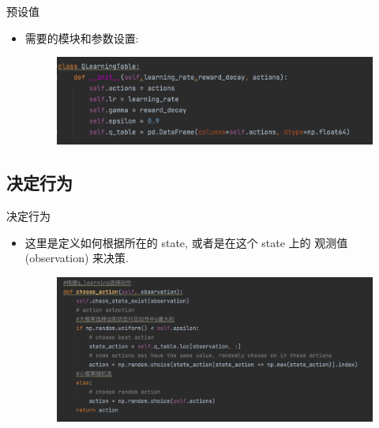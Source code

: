 \documentclass{beamer}
\begin{document}
\begin{frame}{预设值}
    \begin{itemize}
    \item 需要的模块和参数设置:
    \\
    \begin{minipage}{0.5\linewidth}
        \medskip
        \begin{figure}[h]
            \centering
            \includegraphics[height=.4\textheight]{pic/7.png}
        \end{figure}
    \end{minipage}
    
    \end{itemize}
    
\end{frame}


\subsection{决定行为}

\begin{frame}{决定行为}
    \begin{itemize}
    \tiny
        \item 这里是定义如何根据所在的 state, 或者是在这个 state 上的 观测值 (observation) 来决策.
        \begin{minipage}{0.5\linewidth}
        \medskip
        \begin{figure}[h]
            \centering
            \includegraphics[height=.4\textheight]{pic/8.png}
        \end{figure}
    \end{minipage}
    \end{itemize}
\end{frame}
\end{document}
